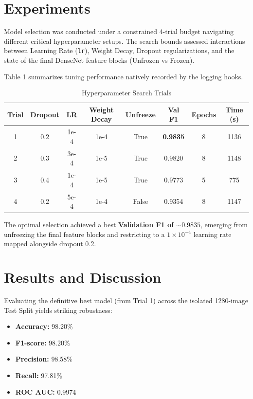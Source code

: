 \documentclass[orivec]{llncs}
\begin{document}
\section{Experiments}
Model selection was conducted under a constrained 4-trial budget navigating different critical hyperparameter setups. The search bounds assessed interactions between Learning Rate (\texttt{lr}), Weight Decay, Dropout regularizations, and the state of the final DenseNet feature blocks (Unfrozen vs Frozen).

Table 1 summarizes tuning performance natively recorded by the logging hooks. 

\begin{table}[htbp]
\centering
\caption{Hyperparameter Search Trials}
\renewcommand{\arraystretch}{1.2}
\setlength{\tabcolsep}{4pt}
\begin{tabular}{@{}cccccccc@{}}
\toprule
\textbf{Trial} & \textbf{Dropout} & \textbf{LR} & \textbf{Weight Decay} & \textbf{Unfreeze} & \textbf{Val F1} & \textbf{Epochs} & \textbf{Time (s)} \\ \midrule
1 & 0.2 & 1e-4 & 1e-4 & True  & \textbf{0.9835} & 8 & 1136 \\
2 & 0.3 & 3e-4 & 1e-5 & True  & 0.9820 & 8 & 1148 \\
3 & 0.4 & 1e-4 & 1e-5 & True  & 0.9773 & 5 & 775  \\
4 & 0.2 & 5e-4 & 1e-4 & False & 0.9354 & 8 & 1147 \\ \bottomrule
\end{tabular}
\end{table}

The optimal selection achieved a best \textbf{Validation F1 of \(\sim 0.9835\)}, emerging from unfreezing the final feature blocks and restricting to a \(1 \times 10^{-4}\) learning rate mapped alongside dropout 0.2.

\section{Results and Discussion}
Evaluating the definitive best model (from Trial 1) across the isolated 1280-image Test Split yields striking robustness:
\begin{itemize}
    \item \textbf{Accuracy:} 98.20\%
    \item \textbf{F1-score:} 98.20\%
    \item \textbf{Precision:} 98.58\%
    \item \textbf{Recall:} 97.81\%
    \item \textbf{ROC AUC:} 0.9974
\end{itemize}
\end{document}
